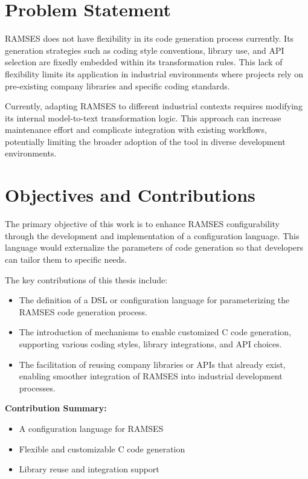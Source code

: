\section{Problem Statement}

\gls{RAMSES} does not have flexibility in its code generation process currently. Its generation strategies such as coding style conventions, library use, and \gls{API} selection are fixedly embedded within its transformation rules. This lack of flexibility limits its application in industrial environments where projects rely on pre-existing company libraries and specific coding standards.
\par
Currently, adapting \gls{RAMSES} to different industrial contexts requires modifying its internal model-to-text transformation logic. This approach can increase maintenance effort and complicate integration with existing workflows, potentially limiting the broader adoption of the tool in diverse development environments. 


\section{Objectives and Contributions}
\label{sec:obj_and_contrib}

The primary objective of this work is to enhance \gls{RAMSES} configurability through the development and implementation of a configuration language. This language would externalize the parameters of code generation so that developers can tailor them to specific needs.

The key contributions of this thesis include:
\begin{itemize}
	\item The definition of a \gls{DSL} or configuration language for parameterizing the \gls{RAMSES} code generation process.
	\item The introduction of mechanisms to enable customized C code generation, supporting various coding styles, library integrations, and \gls{API} choices.
	\item The facilitation of reusing company libraries or \gls{API}s that already exist, enabling smoother integration of \gls{RAMSES} into industrial development processes.
\end{itemize}

\begin{tcolorbox}[colback=blue!5]
	\textbf{Contribution Summary:}
	\begin{itemize}
		\item A configuration language for \gls{RAMSES}
		\item Flexible and customizable C code generation
		\item Library reuse and integration support
	\end{itemize}
\end{tcolorbox}



